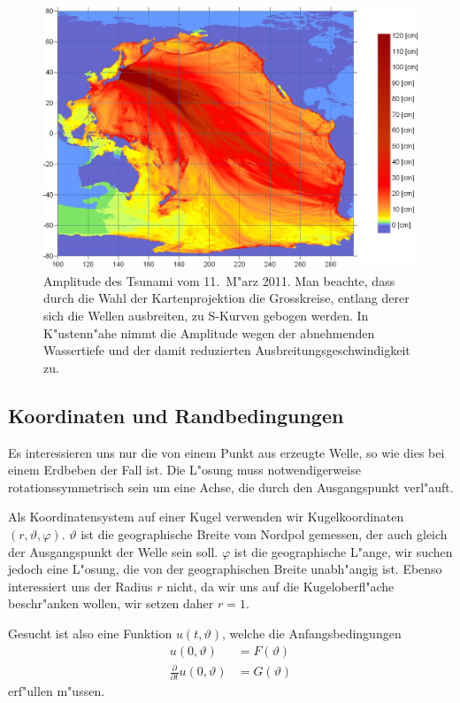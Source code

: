 \begin{figure}
\begin{center}
\includegraphics[width=\hsize]{graphics/sendaienergy}
\end{center}
\caption{Amplitude des Tsunami vom 11.~M"arz 2011.
Man beachte, dass durch die Wahl der Kartenprojektion 
die Grosskreise, entlang derer sich die Wellen ausbreiten,
zu S-Kurven gebogen werden. In K"ustenn"ahe nimmt die
Amplitude wegen der abnehmenden Wassertiefe und der damit
reduzierten Ausbreitungsgeschwindigkeit zu.
\label{tsunamienergie}}
\end{figure}


\subsection{Koordinaten und Randbedingungen}
Es interessieren uns nur die von einem Punkt aus erzeugte Welle,
so wie dies bei einem Erdbeben der Fall ist. Die L"osung muss
notwendigerweise rotationssymmetrisch sein um eine Achse, die
durch den Ausgangspunkt verl"auft. 

Als Koordinatensystem auf einer Kugel verwenden wir Kugelkoordinaten
$(r,\vartheta,\varphi)$. $\vartheta$ ist die geographische Breite
vom Nordpol gemessen, der auch gleich der Ausgangspunkt der
Welle sein soll. $\varphi$ ist die geographische L"ange, wir
suchen jedoch eine L"osung, die von der geographischen Breite
unabh"angig ist. Ebenso interessiert uns der Radius $r$ nicht,
da wir uns auf die Kugeloberfl"ache beschr"anken wollen, wir
setzen daher $r=1$.

Gesucht ist also eine Funktion $u(t,\vartheta)$, welche die
Anfangsbedingungen
\begin{align*}
u(0,\vartheta)&=F(\vartheta)\\
\frac{\partial}{\partial t}u(0,\vartheta)&=G(\vartheta)
\end{align*}
erf"ullen m"ussen.

